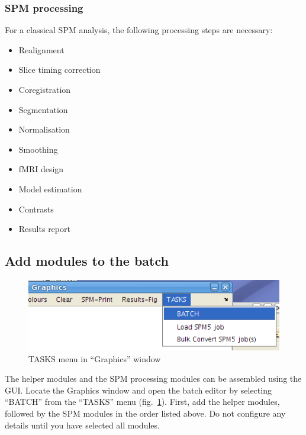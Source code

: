 \subsubsection{SPM processing}

For a classical SPM analysis, the following processing steps are necessary:

\begin{itemize}
\item Realignment
\item Slice timing correction
\item Coregistration
\item Segmentation
\item Normalisation
\item Smoothing
\item fMRI design
\item Model estimation
\item Contrasts
\item Results report
\end{itemize}

\subsection{Add modules to the batch}

\begin{figure}[htbp]
  \centering
  \includegraphics{batch/tasks}
  \caption{TASKS menu in ``Graphics'' window}
  \label{fig:tasks}
\end{figure}
The helper modules and the SPM processing modules can be assembled using the
GUI. Locate the Graphics window and open the batch editor by selecting
``BATCH'' from the ``TASKS'' menu (fig.~\ref{fig:tasks}). First, add the
helper modules, followed by the SPM modules in the order listed above. Do not
configure any details until you have selected all modules.

